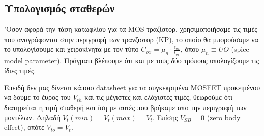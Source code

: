 \documentclass[12pt, a4paper]{article}
\begin{document}
\subsection{Υπολογισμός σταθερών}

'Οσον αφορά την τάση κατωφλίου για τα MOS τραζίστορ, χρησιμοποιήσαμε τις τιμές που αναγράφονται στην περιγραφή των τρανζιστορ (KP), το οποίο θα μπορούσαμε να το υπολογίσουμε και χειροκίνητα με τον τύπο $C_{ox} = \mu_n \cdot \frac{\epsilon_{ox}}{t_{ox}}$, όπου  $\mu_n \equiv UO$ (spice model parameter). Πράγματι βλέπουμε ότι και με τους δύο τρόπους υπολογίζουμε τις ίδιες τιμές.
    
Επειδή δεν μας δίνεται κάποιο datasheet για τα συγκεκριμένα MOSFET προκειμένου να δούμε το έυρος του $V_{th}$ και τις μέγιστες και ελάχιστες τιμές, θεωρούμε ότι διατηρείται η τιμή σταθερή και ίση με αυτές που βρήκαμε απο την περιγραφή των μοντέλων. Δηλαδή $V_t(min) = V_t(max) = V_t$. Επίσης $V_{SB} = 0$ (zero body effect), οπότε $V_{to} = V_t$.

\end{document}

